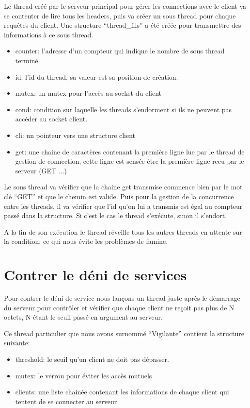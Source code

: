 \documentclass{article}
\begin{document}
Le thread créé par le serveur principal pour gérer les connections avec le client va se contenter de lire tous les headers, puis va créer un sous thread pour chaque requêtes du client.
Une structure ``thread\_fils'' a été créée pour transmettre des informations à ce sous thread.
\begin{itemize}
\item counter: l'adresse d'un compteur qui indique le nombre de sous thread terminé
\item id: l'id du thread, sa valeur est sa position de création.
\item mutex: un mutex pour l'accès au socket du client
\item cond: condition sur laquelle les threads s'endorment si ils ne peuvent pas accéder
  au socket client.
\item cli: un pointeur vers une structure client
\item get: une chaine de caractères contenant la première ligne lue par le thread de gestion de connection, cette ligne est sensée être la première ligne recu par le serveur (GET ...)
\end{itemize}

Le sous thread va vérifier que la chaine get transmise commence bien par le mot clé ``GET'' et que le chemin est valide. Puis pour la gestion de la concurrence entre les threads, il va vérifier que l'id qu'on lui a transmis est égal au compteur passé dans la structure. Si c'est le cas le thread s'exécute, sinon il s'endort.

A la fin de son exécution le thread réveille tous les autres threads en attente sur la condition, ce qui nous évite les problèmes de famine.

\section{Contrer le déni de services}

Pour contrer le déni de service nous lançons un thread juste après le démarrage du serveur pour contrôler et vérifier que chaque client ne reçoit pas plus de N octets, N
étant le seuil passé en argument au serveur.

Ce thread particulier que nous avons surnommé ``Vigilante'' contient la structure suivante:
\begin{itemize}
\item threshold: le seuil qu'un client ne doit pas dépasser.
\item mutex: le verrou pour éviter les accès mutuels
\item clients: une liste chainée contenant les informations de chaque client qui tentent de se connecter au serveur
\end{itemize}
\end{document}
